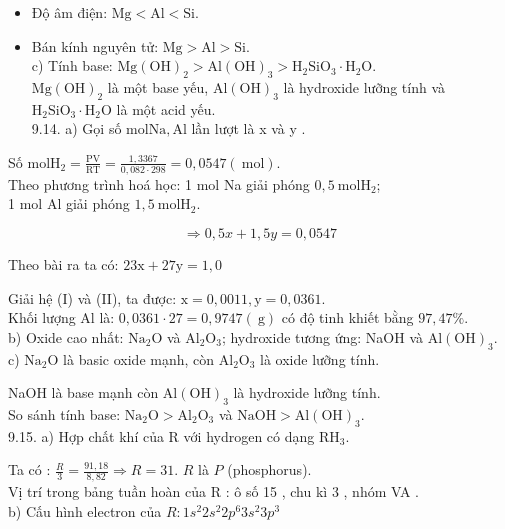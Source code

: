\documentclass[10pt]{article}
\begin{document}
\begin{itemize}
  \item Độ âm điện: $\mathrm{Mg}<\mathrm{Al}<\mathrm{Si}$.
  \item Bán kính nguyên tử: $\mathrm{Mg}>\mathrm{Al}>\mathrm{Si}$.\\
c) Tính base: $\mathrm{Mg}(\mathrm{OH})_{2}>\mathrm{Al}(\mathrm{OH})_{3}>\mathrm{H}_{2} \mathrm{SiO}_{3} \cdot \mathrm{H}_{2} \mathrm{O}$.\\
$\mathrm{Mg}(\mathrm{OH})_{2}$ là một base yếu, $\mathrm{Al}(\mathrm{OH})_{3}$ là hydroxide lưỡng tính và $\mathrm{H}_{2} \mathrm{SiO}_{3} \cdot \mathrm{H}_{2} \mathrm{O}$ là một acid yếu.\\
9.14. a) Gọi số $\mathrm{mol} \mathrm{Na}, \mathrm{Al}$ lần lượt là x và y .
\end{itemize}

Số $\mathrm{mol} \mathrm{H}_{2}=\frac{\mathrm{PV}}{\mathrm{RT}}=\frac{1,3367}{0,082 \cdot 298}=0,0547(\mathrm{~mol})$.\\
Theo phương trình hoá học: 1 mol Na giải phóng $0,5 \mathrm{~mol} \mathrm{H}_{2}$;\\
1 mol Al giải phóng $1,5 \mathrm{~mol} \mathrm{H}_{2}$.


\begin{equation*}
\Rightarrow 0,5 x+1,5 y=0,0547 \tag{I}
\end{equation*}


Theo bài ra ta có: $23 \mathrm{x}+27 \mathrm{y}=1,0$

Giải hệ (I) và (II), ta được: $\mathrm{x}=0,0011, \mathrm{y}=0,0361$.\\
Khối lượng Al là: $0,0361 \cdot 27=0,9747(\mathrm{~g})$ có độ tinh khiết bằng $97,47 \%$.\\
b) Oxide cao nhất: $\mathrm{Na}_{2} \mathrm{O}$ và $\mathrm{Al}_{2} \mathrm{O}_{3}$; hydroxide tương ứng: NaOH và $\mathrm{Al}(\mathrm{OH})_{3}$.\\
c) $\mathrm{Na}_{2} \mathrm{O}$ là basic oxide mạnh, còn $\mathrm{Al}_{2} \mathrm{O}_{3}$ là oxide lưỡng tính.

NaOH là base mạnh còn $\mathrm{Al}(\mathrm{OH})_{3}$ là hydroxide lưỡng tính.\\
So sánh tính base: $\mathrm{Na}_{2} \mathrm{O}>\mathrm{Al}_{2} \mathrm{O}_{3}$ và $\mathrm{NaOH}>\mathrm{Al}(\mathrm{OH})_{3}$.\\
9.15. a) Hợp chất khí của R với hydrogen có dạng $\mathrm{RH}_{3}$.

Ta có : $\frac{R}{3}=\frac{91,18}{8,82} \Rightarrow R=31$. $R$ là $P$ (phosphorus).\\
Vị trí trong bảng tuần hoàn của R : ô số 15 , chu kì 3 , nhóm VA .\\
b) Cấu hình electron của $R: 1 s^{2} 2 s^{2} 2 p^{6} 3 s^{2} 3 p^{3}$
\end{document}
